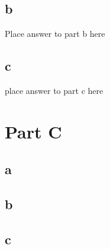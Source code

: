 \documentclass[12pt]{amsart}
\begin{document}
\subsection*{b}
Place answer to part b here

\subsection*{c}
place answer to part c here

\newpage

\section*{Part C}
\subsection*{a}

\subsection*{b}

\subsection*{c}
\end{document}

